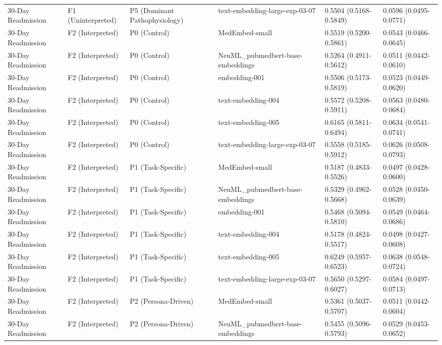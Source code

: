 \documentclass[border=0pt]{standalone}
\begin{document}
\begin{adjustbox}{width=\textwidth}
\begin{tabular}{llllll}
30-Day Readmission & F1 (Uninterpreted) & P5 (Dominant Pathophysiology) & text-embedding-large-exp-03-07 & 0.5504 (0.5168-0.5849) & 0.0596 (0.0495-0.0771) \\
30-Day Readmission & F2 (Interpreted) & P0 (Control) & MedEmbed-small & 0.5519 (0.5200-0.5861) & 0.0543 (0.0466-0.0645) \\
30-Day Readmission & F2 (Interpreted) & P0 (Control) & NeuML\_pubmedbert-base-embeddings & 0.5264 (0.4911-0.5612) & 0.0511 (0.0442-0.0610) \\
30-Day Readmission & F2 (Interpreted) & P0 (Control) & embedding-001 & 0.5506 (0.5173-0.5819) & 0.0523 (0.0449-0.0620) \\
30-Day Readmission & F2 (Interpreted) & P0 (Control) & text-embedding-004 & 0.5572 (0.5208-0.5911) & 0.0563 (0.0480-0.0684) \\
30-Day Readmission & F2 (Interpreted) & P0 (Control) & text-embedding-005 & 0.6165 (0.5811-0.6494) & 0.0634 (0.0541-0.0741) \\
30-Day Readmission & F2 (Interpreted) & P0 (Control) & text-embedding-large-exp-03-07 & 0.5558 (0.5185-0.5912) & 0.0626 (0.0508-0.0793) \\
30-Day Readmission & F2 (Interpreted) & P1 (Task-Specific) & MedEmbed-small & 0.5187 (0.4833-0.5526) & 0.0497 (0.0428-0.0600) \\
30-Day Readmission & F2 (Interpreted) & P1 (Task-Specific) & NeuML\_pubmedbert-base-embeddings & 0.5329 (0.4962-0.5668) & 0.0528 (0.0450-0.0639) \\
30-Day Readmission & F2 (Interpreted) & P1 (Task-Specific) & embedding-001 & 0.5468 (0.5094-0.5810) & 0.0549 (0.0464-0.0686) \\
30-Day Readmission & F2 (Interpreted) & P1 (Task-Specific) & text-embedding-004 & 0.5178 (0.4824-0.5517) & 0.0498 (0.0427-0.0608) \\
30-Day Readmission & F2 (Interpreted) & P1 (Task-Specific) & text-embedding-005 & 0.6249 (0.5957-0.6523) & 0.0638 (0.0548-0.0724) \\
30-Day Readmission & F2 (Interpreted) & P1 (Task-Specific) & text-embedding-large-exp-03-07 & 0.5650 (0.5297-0.6027) & 0.0584 (0.0497-0.0713) \\
30-Day Readmission & F2 (Interpreted) & P2 (Persona-Driven) & MedEmbed-small & 0.5361 (0.5037-0.5707) & 0.0511 (0.0442-0.0604) \\
30-Day Readmission & F2 (Interpreted) & P2 (Persona-Driven) & NeuML\_pubmedbert-base-embeddings & 0.5455 (0.5096-0.5793) & 0.0529 (0.0453-0.0652) \\

\end{tabular}
\end{adjustbox}
\end{document}

